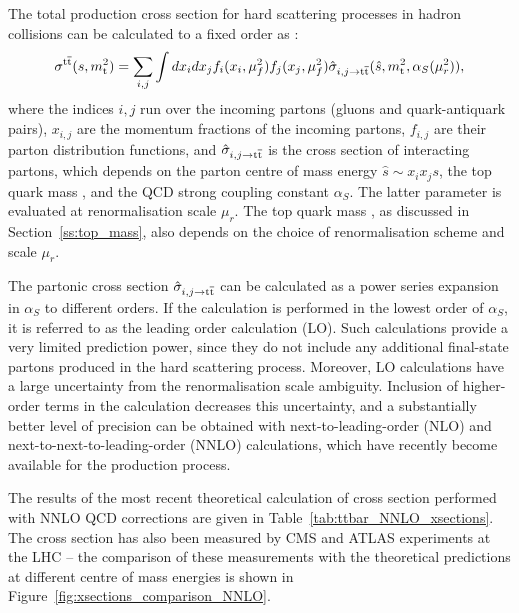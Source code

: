 The total \ttbar production cross section for hard scattering processes in hadron collisions can be calculated to a
fixed order as \autocite{Sterman1986, primer_LHC}:
\begin{equation}
\sigma^{\mathrm{t}\overline{\mathrm{t}}} (s,m_\mathrm{t}^2) = \sum_{i,j} \int dx_i dx_j f_i(x_i, \mu_f^2) f_j(x_j,\mu_f^2) \hat{\sigma}_{i,j
\rightarrow \mathrm{t}\overline{\mathrm{t}}} (\hat{s}, m_\mathrm{t}^2, \alpha_S(\mu_r^2)),
\end{equation}
where the indices $i,j$ run over the incoming partons (gluons and quark-antiquark pairs), $x_{i,j}$ are the momentum
fractions of the incoming partons, $f_{i,j}$ are their parton distribution functions, and $\hat{\sigma}_{i,j
\rightarrow \mathrm{t}\overline{\mathrm{t}}}$ is the cross section of interacting partons, which depends on the parton centre of mass energy
$\hat{s} \sim x_i x_j s$, the top quark mass \mtop, and the QCD strong coupling constant $\alpha_S$. The latter
parameter is evaluated at renormalisation scale $\mu_r$. The top quark mass \mtop, as discussed in
Section~\ref{ss:top_mass}, also depends on the choice of renormalisation scheme and scale $\mu_r$.

The partonic cross section $\hat{\sigma}_{i,j\rightarrow \mathrm{t}\overline{\mathrm{t}}}$ can be calculated as a power series expansion in
$\alpha_S$ to different orders. If the calculation is performed in the lowest order of $\alpha_S$, it is referred to as
the leading order calculation (LO). Such calculations provide a very limited prediction power, since they do not include
any additional final-state partons produced in the hard scattering process. Moreover, LO calculations have a large
uncertainty from the renormalisation scale ambiguity. Inclusion of higher-order terms in the calculation decreases this
uncertainty, and a substantially better level of precision can be obtained with next-to-leading-order (NLO) and
next-to-next-to-leading-order (NNLO) calculations, which have recently become available for the \ttbar production
process.

The results of the most recent theoretical calculation of \ttbar cross section performed with NNLO QCD corrections
\autocite{NNLO_ttbar} are given in Table~\ref{tab:ttbar_NNLO_xsections}. The cross section has also been measured by CMS
and ATLAS experiments at the LHC -- the comparison of these measurements with the theoretical predictions at different
centre of mass energies is shown in Figure~\ref{fig:xsections_comparison_NNLO}.



